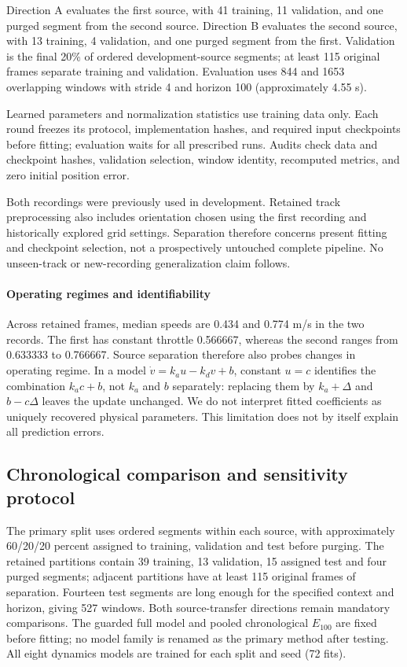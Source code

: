 \documentclass[preprint,12pt]{elsarticle}
\begin{document}
Direction A evaluates the first source, with 41 training, 11 validation, and one
purged segment from the second source. Direction B evaluates the second source,
with 13 training, 4 validation, and one purged segment from the first.
Validation is the final 20\% of ordered development-source segments; at least
115 original frames separate training and validation. Evaluation uses 844 and
1653 overlapping windows with stride 4 and horizon 100 (approximately 4.55 s).

Learned parameters and normalization statistics use training data only. Each
round freezes its protocol, implementation hashes, and required input checkpoints
before fitting; evaluation waits for all prescribed runs. Audits check data and
checkpoint hashes, validation selection, window identity, recomputed metrics,
and zero initial position error.

Both recordings were previously used in development. Retained track preprocessing
also includes orientation chosen using the first recording and historically
explored grid settings. Separation therefore concerns present fitting and
checkpoint selection, not a prospectively untouched complete pipeline.
No unseen-track or new-recording generalization claim follows.


\paragraph{Operating regimes and identifiability}
Across retained frames, median speeds are 0.434 and 0.774 m/s in the two records.
The first has constant throttle 0.566667, whereas the second ranges from
0.633333 to 0.766667. Source separation therefore also probes changes in operating
regime. In a model $\dot v=k_a u-k_dv+b$, constant $u=c$ identifies the combination
$k_ac+b$, not $k_a$ and $b$ separately: replacing them by $k_a+\Delta$ and
$b-c\Delta$ leaves the update unchanged. We do not interpret fitted coefficients
as uniquely recovered physical parameters. This limitation does not by itself
explain all prediction errors.

\subsection{Chronological comparison and sensitivity protocol}
The primary split uses ordered segments within each source, with approximately
60/20/20 percent assigned to training, validation and test before purging.
The retained partitions contain 39 training, 13 validation, 15 assigned test and
four purged segments; adjacent partitions have at least 115 original frames of
separation. Fourteen test segments are long enough for the specified context and
horizon, giving 527 windows. Both source-transfer directions remain mandatory
comparisons. The guarded full model and pooled chronological $E_{100}$ are fixed
before fitting; no model family is renamed as the primary method after testing.
All eight dynamics models are trained for each split and seed (72 fits).
\end{document}
